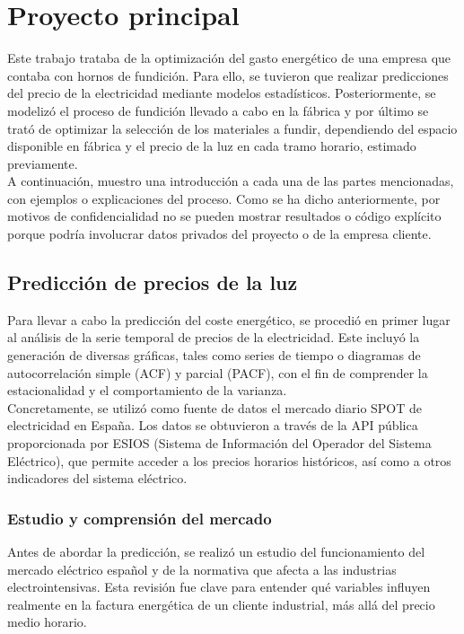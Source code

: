 \section{Proyecto principal}
%
%
Este trabajo trataba de la optimización del gasto energético de una empresa que contaba con hornos de fundición. Para ello, se tuvieron que realizar predicciones del precio de la electricidad mediante modelos estadísticos. Posteriormente, se modelizó el proceso de fundición llevado a cabo en la fábrica y por último se trató de optimizar la selección de los materiales a fundir, dependiendo del espacio disponible en fábrica y el precio de la luz en cada tramo horario, estimado previamente.\\

A continuación, muestro una introducción a cada una de las partes mencionadas, con ejemplos o explicaciones del proceso. Como se ha dicho anteriormente, por motivos de confidencialidad no se pueden mostrar resultados o código explícito porque podría involucrar datos privados del proyecto o de la empresa cliente.
%
%
\subsection{Predicción de precios de la luz}
%
%
%
%
Para llevar a cabo la predicción del coste energético, se procedió en primer lugar al análisis de la serie temporal de precios de la electricidad. Este incluyó la generación de diversas gráficas, tales como series de tiempo o diagramas de autocorrelación simple (ACF) y parcial (PACF), con el fin de comprender la estacionalidad y el comportamiento de la varianza.\\

Concretamente, se utilizó como fuente de datos el mercado diario SPOT de electricidad en España. Los datos se obtuvieron a través de la API pública proporcionada por ESIOS (Sistema de Información del Operador del Sistema Eléctrico), que permite acceder a los precios horarios históricos, así como a otros indicadores del sistema eléctrico.
%
%
%
\subsubsection{Estudio y comprensión del mercado}
%
%
%
Antes de abordar la predicción, se realizó un estudio del funcionamiento del mercado eléctrico español y de la normativa que afecta a las industrias electrointensivas. Esta revisión fue clave para entender qué variables influyen realmente en la factura energética de un cliente industrial, más allá del precio medio horario.\\

